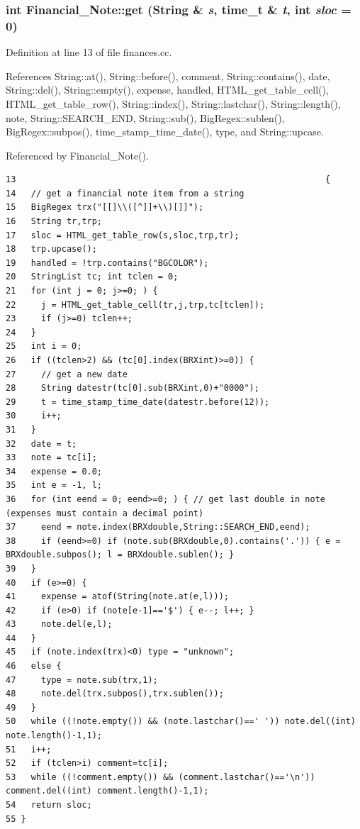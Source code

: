 \subsubsection{\setlength{\rightskip}{0pt plus 5cm}int Financial\_\-Note::get ({\bf String} \& {\em s}, time\_\-t \& {\em t}, int {\em sloc} = 0)}\label{classFinancial__Note_a3}




Definition at line 13 of file finances.cc.

References String::at(), String::before(), comment, String::contains(), date, String::del(), String::empty(), expense, handled, HTML\_\-get\_\-table\_\-cell(), HTML\_\-get\_\-table\_\-row(), String::index(), String::lastchar(), String::length(), note, String::SEARCH\_\-END, String::sub(), Big\-Regex::sublen(), Big\-Regex::subpos(), time\_\-stamp\_\-time\_\-date(), type, and String::upcase.

Referenced by Financial\_\-Note().



\footnotesize\begin{verbatim}13                                                             {
14   // get a financial note item from a string
15   BigRegex trx("[[]\\([^]]+\\)[]]");
16   String tr,trp;
17   sloc = HTML_get_table_row(s,sloc,trp,tr);
18   trp.upcase();
19   handled = !trp.contains("BGCOLOR");
20   StringList tc; int tclen = 0;
21   for (int j = 0; j>=0; ) {
22     j = HTML_get_table_cell(tr,j,trp,tc[tclen]);
23     if (j>=0) tclen++;
24   }
25   int i = 0;
26   if ((tclen>2) && (tc[0].index(BRXint)>=0)) {
27     // get a new date
28     String datestr(tc[0].sub(BRXint,0)+"0000");
29     t = time_stamp_time_date(datestr.before(12));
30     i++;
31   }
32   date = t;
33   note = tc[i];
34   expense = 0.0;
35   int e = -1, l;
36   for (int eend = 0; eend>=0; ) { // get last double in note (expenses must contain a decimal point)
37     eend = note.index(BRXdouble,String::SEARCH_END,eend);
38     if (eend>=0) if (note.sub(BRXdouble,0).contains('.')) { e = BRXdouble.subpos(); l = BRXdouble.sublen(); }
39   }
40   if (e>=0) {
41     expense = atof(String(note.at(e,l)));
42     if (e>0) if (note[e-1]=='$') { e--; l++; }
43     note.del(e,l);
44   }
45   if (note.index(trx)<0) type = "unknown";
46   else {
47     type = note.sub(trx,1);
48     note.del(trx.subpos(),trx.sublen());
49   }
50   while ((!note.empty()) && (note.lastchar()==' ')) note.del((int) note.length()-1,1);
51   i++;
52   if (tclen>i) comment=tc[i];
53   while ((!comment.empty()) && (comment.lastchar()=='\n')) comment.del((int) comment.length()-1,1);
54   return sloc;
55 }
\end{verbatim}\normalsize 
{}
